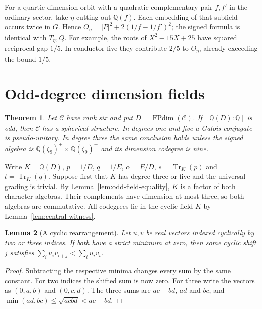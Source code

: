 \documentclass[11pt,reqno]{amsart}
\newtheorem{theorem}{Theorem}[section]
\newtheorem{lemma}[theorem]{Lemma}
\theoremstyle{remark}\newtheorem{remark}[theorem]{Remark}
\numberwithin{equation}{section}
\begin{document}
For a quartic dimension orbit with a quadratic complementary pair
$f,f'$ in the ordinary sector, take $\eta$ cutting out
$\mathbb Q(f)$. Each embedding of that subfield occurs twice in $G$.
Hence $O_\eta=|P|^2+2(1/f-1/f')^2$; the signed formula is identical
with $T_\eta,Q$. For example, the roots of $X^2-15X+25$ have
squared reciprocal gap $1/5$. In conductor five they contribute
$2/5$ to $O_\eta$, already exceeding the bound $1/5$.

\section{Odd-degree dimension fields}
\label{sec:odd-degree-descent}
\begin{theorem}\label{thm:odd-degree-descent}
Let $\mathcal C$ have rank six and put $D=\operatorname{FPdim}(\mathcal C)$.
If $[\mathbb Q(D):\mathbb Q]$ is odd, then $\mathcal C$ has a spherical
structure. In degrees one and five a Galois conjugate is pseudo-unitary.
In degree three the same conclusion holds unless the signed algebra is
$\mathbb Q(\zeta_9)^+\times\mathbb Q(\zeta_9)^+$ and its dimension codegree is nine.
\end{theorem}

Write $K=\mathbb Q(D)$, $p=1/D$, $q=1/E$, $\alpha=E/D$,
$s=\operatorname{Tr}_K(p)$ and $t=\operatorname{Tr}_K(q)$.
Suppose first that $K$ has degree three or five and the universal
grading is trivial. By Lemma~\ref{lem:odd-field-equality}, $K$ is a
factor of both character algebras. Their complements have dimension
at most three, so both algebras are commutative. All codegrees lie in
the cyclic field $K$ by Lemma~\ref{lem:central-witness}.

\begin{lemma}[A cyclic rearrangement]\label{lem:short-orbit-rearrangement}
Let $u,v$ be real vectors indexed cyclically by two or three indices.
If both have a strict minimum at zero, then some cyclic shift $j$
satisfies $\sum_i u_i v_{i+j}<\sum_i u_i v_i$.
\end{lemma}
\begin{proof}
Subtracting the respective minima changes every sum by the same
constant. For two indices the shifted sum is now zero. For three
write the vectors as $(0,a,b)$ and $(0,c,d)$. The three sums are
$ac+bd$, $ad$ and $bc$, and $\min(ad,bc)\le\sqrt{acbd}<ac+bd$.
\end{proof}
\end{document}
